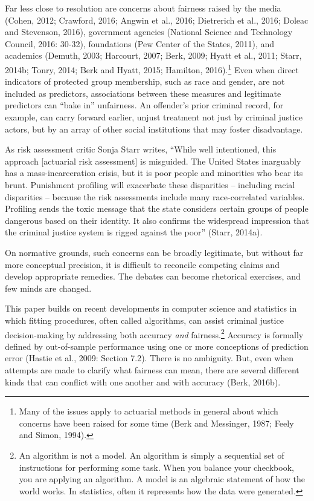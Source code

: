 \documentclass[12pt]{article}
\begin{document}
Far less close to resolution are concerns about fairness raised by the media (Cohen, 2012; Crawford, 2016; Angwin et al., 2016; Dietrerich et al., 2016; Doleac and Stevenson, 2016), government agencies (National Science and Technology Council, 2016: 30-32), foundations (Pew Center of the States, 2011), and academics (Demuth, 2003; Harcourt, 2007; Berk, 2009; Hyatt et al., 2011; Starr, 2014b; Tonry, 2014; Berk and Hyatt, 2015; Hamilton, 2016).\footnote
{
Many of the issues apply to actuarial methods in general about which concerns have been raised for some time (Berk and Messinger, 1987; Feely and Simon, 1994).
 }
Even when direct indicators of protected group membership, such as race and gender, are not included as predictors, associations between these measures and legitimate predictors can ``bake in'' unfairness. An offender's prior criminal record, for example, can carry forward earlier, unjust treatment not just by criminal justice actors, but by an array of other social institutions that may foster disadvantage. 

As risk assessment critic Sonja Starr writes, ``While well intentioned, this approach [actuarial risk assessment] is misguided. The United States inarguably has a mass-incarceration crisis, but it is poor people and minorities who bear its brunt. Punishment profiling will exacerbate these disparities -- including racial disparities -- because the risk assessments include many race-correlated variables. Profiling sends the toxic message that the state considers certain groups of people dangerous based on their identity. It also confirms the widespread impression that the criminal justice system is rigged against the poor'' (Starr, 2014a).

On normative grounds, such concerns can be broadly legitimate, but without far more conceptual precision, it is difficult to reconcile competing claims and develop appropriate remedies. The debates can become rhetorical exercises, and few minds are changed.

This paper builds on recent developments in computer science and statistics in which fitting procedures, often called algorithms, can assist criminal justice decision-making by addressing both accuracy \textit{and} fairness.\footnote
{
An algorithm is not a model. An algorithm is simply a sequential set of instructions for performing some task. When you balance your checkbook, you are applying an algorithm. A model is an algebraic statement of how the world works. In statistics, often it represents how the data were generated.
}
Accuracy is formally defined by out-of-sample performance using one or more conceptions of prediction error (Hastie et al., 2009: Section 7.2). There is no ambiguity. But, even when attempts are made to clarify what fairness can mean, there are several different kinds that can conflict with one another and with accuracy (Berk, 2016b). 
\end{document}
